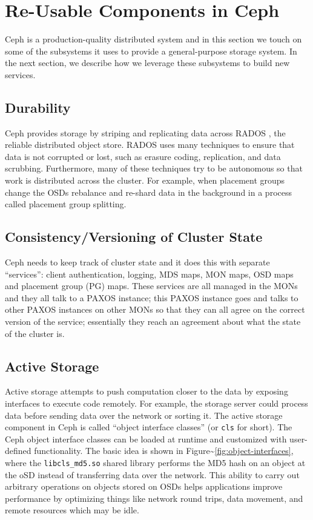 \documentclass[10pt,twocolumn]{article}
\begin{document}
\section{Re-Usable Components in
Ceph}\label{re-usable-components-in-ceph}

\label{background}

Ceph is a production-quality distributed system and in this section we
touch on some of the subsystems it uses to provide a general-purpose
storage system. In the next section, we describe how we leverage these
subsystems to build new services.

\subsection{Durability}\label{durability}

Ceph provides storage by striping and replicating data across RADOS
\autocite{weil_rados_2007}, the reliable distributed object store. RADOS
uses many techniques to ensure that data is not corrupted or lost, such
as erasure coding, replication, and data scrubbing. Furthermore, many of
these techniques try to be autonomous so that work is distributed across
the cluster. For example, when placement groups change the OSDs
rebalance and re-shard data in the background in a process called
placement group splitting.

\subsection{Consistency/Versioning of Cluster
State}\label{consistencyversioning-of-cluster-state}

Ceph needs to keep track of cluster state and it does this with separate
``services'': client authentication, logging, MDS maps, MON maps, OSD
maps and placement group (PG) maps. These services are all managed in
the MONs and they all talk to a PAXOS instance; this PAXOS instance goes
and talks to other PAXOS instances on other MONs so that they can all
agree on the correct version of the service; essentially they reach an
agreement about what the state of the cluster is.

\subsection{Active Storage}\label{active-storage}

Active storage attempts to push computation closer to the data by
exposing interfaces to execute code remotely. For example, the storage
server could process data before sending data over the network or
sorting it. The active storage component in Ceph is called ``object
interface classes'' (or \texttt{cls} for short). The Ceph object
interface classes can be loaded at runtime and customized with
user-defined functionality. The basic idea is shown in
Figure\textasciitilde{}\ref{fig:object-interfaces}, where the
\texttt{libcls\_md5.so} shared library performs the MD5 hash on an
object at the oSD instead of transferring data over the network. This
ability to carry out arbitrary operations on objects stored on OSDs
helps applications improve performance by optimizing things like network
round trips, data movement, and remote resources which may be idle.
\end{document}
